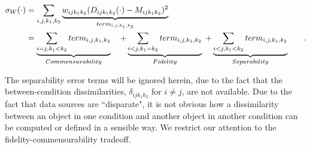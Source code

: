 \documentclass[12pt]{article} %
\begin{document}

\begin{align}
\sigma_W(\cdot)  &=  \sum_{i,j,k_1,k_2} \underbrace{{w_{ij{k_1}{k_2}}(D_{ij{k_1}{k_2}}(\cdot)-M_{ijk_1k_2})^2 }}_{term_{i,j,k_1,k_2}}  & \notag\\
\hspace{3pt} &=  \underbrace{\sum_{i=j,k_1<k_2}  term_{i,j,k_1,k_2}}_{Commensurability}  \hspace{10pt}    +  \underbrace{\sum_{i<j,k_1=k_2}   term_{i,j,k_1,k_2}  } _{Fidelity}
\hspace{3pt}+  \underbrace{\sum_{i< j,k_1<k_2}  term_{i,j,k_1,k_2}  } _{Separability}\label{eq:FidCommSep}\hspace{10pt} &.
\end{align}

 The separability error terms will be ignored herein, due to the fact that the between-condition dissimilarities, 
$\delta_{ijk_1k_2}$ for $i\neq j$, are  not  available. Due to the fact that data sources are ``disparate", it is not obvious how  a dissimilarity between an object in one condition and another object in another condition  can be computed or  defined in a sensible way. We restrict our attention to  the fidelity-commensurability tradeoff. 
\end{document}
